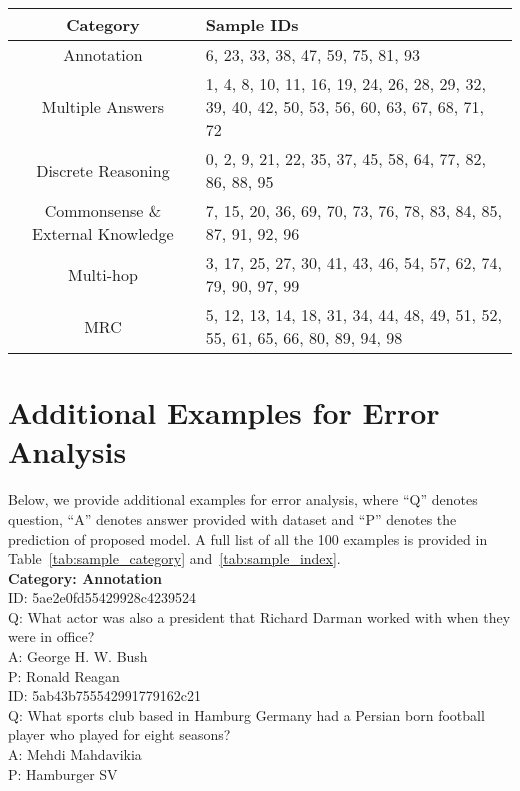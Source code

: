\documentclass[11pt,a4paper]{article}
\begin{document}
\begin{table*}[t!]
    \centering
    \begin{tabular}{cp{8cm}}
    \hline
      Category & Sample IDs \\ \hline
      Annotation & 6, 23, 33, 38, 47, 59, 75, 81, 93 \\
      \hline
      Multiple Answers & 1, 4, 8, 10, 11, 16, 19, 24, 26, 28, 29, 32, 39, 40, 42, 50, 53, 56, 60, 63, 67, 68, 71, 72 \\
      \hline
      Discrete Reasoning & 0, 2, 9, 21, 22, 35, 37, 45, 58, 64, 77, 82, 86, 88, 95 \\
      \hline
      Commonsense \& External Knowledge & 7, 15, 20, 36, 69, 70, 73, 76, 78, 83, 84, 85, 87, 91, 92, 96 \\
      \hline
      Multi-hop & 3, 17, 25, 27, 30, 41, 43, 46, 54, 57, 62, 74, 79, 90, 97, 99 \\
      \hline
      MRC & 5, 12, 13, 14, 18, 31, 34, 44, 48, 49, 51, 52, 55, 61, 65, 66, 80, 89, 94, 98 \\ \hline
    \end{tabular}
    \caption{The categories and sample IDs for the 100 examples selected for error analysis. The sample IDs are mapped to the ground-truth IDs in Table~\ref{tab:sample_index}.}
    \label{tab:sample_category}
\end{table*}

\section{Additional Examples for Error Analysis} \label{appendix:additional_examples}

Below, we provide additional examples for error analysis, where ``Q'' denotes question, ``A'' denotes answer provided with dataset and ``P'' denotes the prediction of proposed model. A full list of all the 100 examples is provided in Table~\ref{tab:sample_category} and~\ref{tab:sample_index}. \\

\noindent \textbf{Category: Annotation} \\
\noindent ID: 5ae2e0fd55429928c4239524 \\
Q: What actor was also a president that Richard Darman worked with when they were in office? \\
A: George H. W. Bush \\
P: Ronald Reagan \\
 
\noindent ID: 5ab43b755542991779162c21 \\
Q: What sports club based in Hamburg Germany had a Persian born football player who played for eight seasons? \\
A: Mehdi Mahdavikia \\
P: Hamburger SV \\
\end{document}
